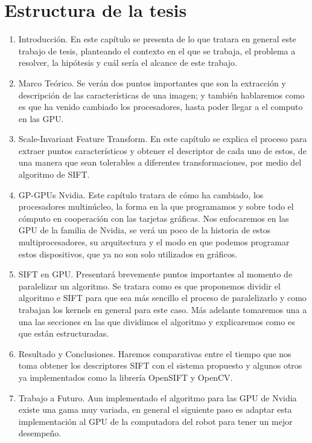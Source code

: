 \section{Estructura de la tesis}
\begin{enumerate}




\item Introducción. En este capítulo se presenta de lo que tratara en general este trabajo de tesis, planteando el contexto en el que se trabaja, el problema a resolver, la hipótesis y cuál sería el alcance de este trabajo.\\

\item Marco Teórico. Se verán dos puntos importantes que son la extracción y descripción de las características de una imagen; y también hablaremos como es que ha venido cambiado los procesadores, hasta poder llegar a el computo en las GPU.\\

\item Scale-Invariant Feature Transform. En este capítulo se explica el proceso para extraer puntos característicos y obtener el descriptor de cada uno de estos, de una manera que sean tolerables a diferentes transformaciones, por medio del algoritmo de SIFT.\\


\item GP-GPUs Nvidia.  Este capítulo tratara de cómo ha cambiado, los procesadores multinúcleo, la forma en la que programamos y sobre todo el cómputo en cooperación con las tarjetas gráficas. Nos enfocaremos en las GPU de la familia de Nvidia, se verá un poco de la historia de estos multiprocesadores, su arquitectura y el modo en que podemos programar estos dispositivos, que ya no son solo utilizados en gráficos.\\


\item SIFT en GPU. Presentará brevemente puntos importantes al momento de paralelizar un algoritmo.
Se tratara como es que proponemos dividir el algoritmo e SIFT para que sea más sencillo el proceso de paralelizarlo y como trabajan los kernels en general para este caso.
Más adelante tomaremos una a una las secciones en las que dividimos el algoritmo y explicaremos como es que están estructuradas.\\


\item Resultado y Conclusiones. Haremos comparativas entre el tiempo que nos toma obtener los descriptores SIFT con el sistema propuesto y algunos otros ya implementados como la librería OpenSIFT y OpenCV.\\

\item Trabajo a Futuro. Aun implementado el algoritmo para las GPU de Nvidia existe una gama muy variada, en general el siguiente paso es adaptar esta implementación al GPU de la computadora del robot para tener un mejor desempeño.\\

\end{enumerate}






